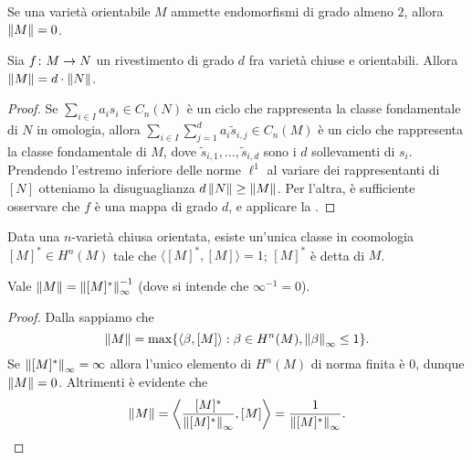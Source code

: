 \begin{corollary}
Se una varietà orientabile $M$ ammette endomorfismi di grado almeno $2$, allora $\left\lVert M\right\rVert=0$.
\end{corollary}

\begin{proposition}
Sia $\map{f}{M}{N}$ un rivestimento di grado $d$ fra varietà chiuse e orientabili. Allora $\left\lVert M\right\rVert=d\cdot\left\lVert N\right\rVert$.
\end{proposition}
\begin{proof}
Se $\sum_{i\in I}a_is_i\in C_n(N)$ è un ciclo che rappresenta la classe fondamentale di $N$ in omologia, allora $\sum_{i\in I}\sum_{j=1}^da_i\widetilde{s}_{i,j}\in C_n(M)$ è un ciclo che rappresenta la classe fondamentale di $M$, dove $\widetilde{s}_{i,1},\ldots,\widetilde{s}_{i,d}$ sono i $d$ sollevamenti di $s_i$. Prendendo l'estremo inferiore delle norme $\ell^1$ al variare dei rappresentanti di $[N]$ otteniamo la disuguaglianza $d\left\lVert N\right\rVert\ge\left\lVert M\right\rVert$. Per l'altra, è sufficiente osservare che $f$ è una mappa di grado $d$, e applicare la .
\end{proof}

Data una $n$-varietà chiusa orientata, esiste un'unica classe in coomologia $[M]^*\in H^n(M)$ tale che $\langle[M]^*,[M]\rangle=1$; $[M]^*$ è detta  di $M$.
\begin{proposition}
Vale $\left\lVert M\right\rVert=\left\lVert [M]^*\right\rVert_\infty^{-1}$ (dove si intende che $\infty^{-1}=0$).
\end{proposition}
\begin{proof}
Dalla  sappiamo che
\[
\left\lVert M\right\rVert=\max\{\langle\beta,[M]\rangle:\beta\in H^n(M),\left\lVert \beta\right\rVert_\infty\le 1\}.
\]
Se $\left\lVert [M]^*\right\rVert_\infty=\infty$ allora l'unico elemento di $H^n(M)$ di norma finita è $0$, dunque $\left\lVert M\right\rVert=0$. Altrimenti è evidente che
\[
\left\lVert M\right\rVert=\left\langle\frac{[M]^*}{\left\lVert [M]^*\right\rVert_\infty},[M]\right\rangle=\frac{1}{\left\lVert [M]^*\right\rVert_\infty}.\qedhere
\]
\end{proof}